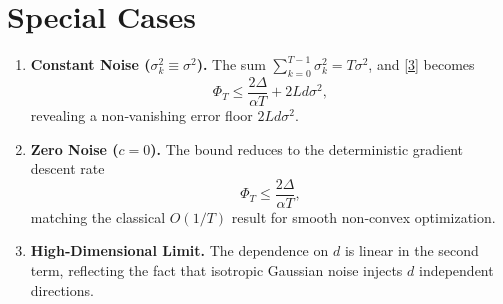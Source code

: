 \documentclass{article}
\begin{document}
\section*{Special Cases}
\begin{enumerate}[label=\alph*)]
\item \textbf{Constant Noise ($\sigma_{k}^{2}\equiv\sigma^{2}$).}  
   The sum $\sum_{k=0}^{T-1}\sigma_{k}^{2}=T\sigma^{2}$, and \eqref{3} becomes
   \[
   \Phi_{T}\le \frac{2\Delta}{\alpha T}+2L d\sigma^{2},
   \]
   revealing a non‑vanishing error floor $2L d\sigma^{2}$.
\item \textbf{Zero Noise ($c=0$).}  
   The bound reduces to the deterministic gradient descent rate
   \[
   \Phi_{T}\le \frac{2\Delta}{\alpha T},
   \]
   matching the classical $O(1/T)$ result for smooth non‑convex optimization.
\item \textbf{High‑Dimensional Limit.}  
   The dependence on $d$ is linear in the second term, reflecting the fact that isotropic Gaussian noise injects $d$ independent directions.
\end{enumerate}
\end{document}
